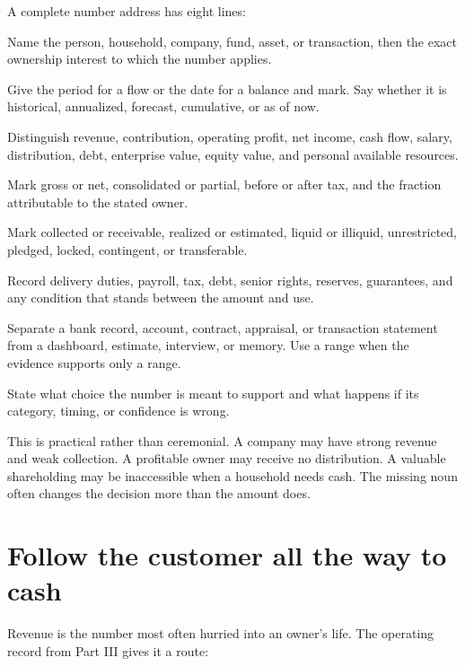 A complete number address has eight lines:

\enlargethispage{\baselineskip}

\begin{description}[leftmargin=0em,style=unboxed,itemsep=0.1em,
  topsep=0.2em,parsep=0em,labelsep=0.55em]
\item[Entity and share] Name the person, household, company, fund, asset, or
  transaction, then the exact ownership interest to which the number applies.
\item[Time] Give the period for a flow or the date for a balance and mark. Say
  whether it is historical, annualized, forecast, cumulative, or as of now.
\item[Category] Distinguish revenue, contribution, operating profit, net income,
  cash flow, salary, distribution, debt, enterprise value, equity value, and
  personal available resources.
\item[Scope] Mark gross or net, consolidated or partial, before or after tax,
  and the fraction attributable to the stated owner.
\item[State] Mark collected or receivable, realized or estimated, liquid or
  illiquid, unrestricted, pledged, locked, contingent, or transferable.
\item[Claims ahead] Record delivery duties, payroll, tax, debt, senior rights,
  reserves, guarantees, and any condition that stands between the amount and use.
\item[Source and confidence] Separate a bank record, account, contract, appraisal,
  or transaction statement from a dashboard, estimate, interview, or memory.
  Use a range when the evidence supports only a range.
\item[Decision] State what choice the number is meant to support and what happens
  if its category, timing, or confidence is wrong.
\end{description}

This is practical rather than ceremonial. A company may have strong revenue and
weak collection. A profitable owner may receive no distribution. A valuable
shareholding may be inaccessible when a household needs cash. The missing noun
often changes the decision more than the amount does.

\section{Follow the customer all the way to cash}

Revenue is the number most often hurried into an owner's life. The operating
record from Part III gives it a route:

